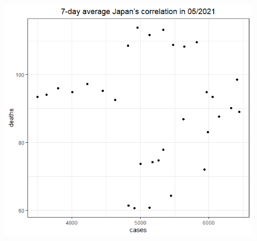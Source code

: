 \documentclass[english,10pt,table]{beamer}
\begin{document}
{\begin{figure}[H]
\begin{center}
        \includegraphics[scale = 0.2]{ix/ix.3/JPN_05_2021.png}
    \end{center}
    \end{figure}
}
\end{document}
